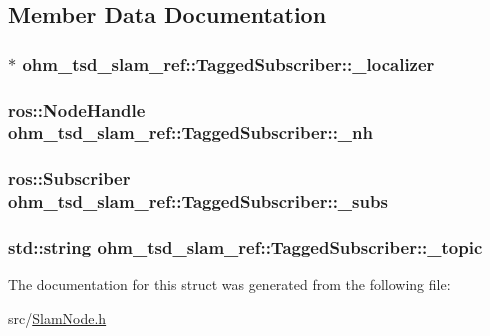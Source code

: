 \subsection{Member Data Documentation}
\hypertarget{structohm__tsd__slam__ref_1_1TaggedSubscriber_afe33f4a8274392173ea2a4ff05f49bc4}{
\subsubsection[{\-\_\-localizer}]{$\ast$ ohm\-\_\-tsd\-\_\-slam\-\_\-ref\-::\-Tagged\-Subscriber\-::\-\_\-localizer}}\label{structohm__tsd__slam__ref_1_1TaggedSubscriber_afe33f4a8274392173ea2a4ff05f49bc4}
\hypertarget{structohm__tsd__slam__ref_1_1TaggedSubscriber_a0ff0c67d13bf2c9c606c25ffa24db8df}{
\subsubsection[{\-\_\-nh}]{\setlength{\rightskip}{0pt plus 5cm}ros\-::\-Node\-Handle ohm\-\_\-tsd\-\_\-slam\-\_\-ref\-::\-Tagged\-Subscriber\-::\-\_\-nh}}\label{structohm__tsd__slam__ref_1_1TaggedSubscriber_a0ff0c67d13bf2c9c606c25ffa24db8df}
\hypertarget{structohm__tsd__slam__ref_1_1TaggedSubscriber_a61345fb4c4b4e617dfffe70b5b1bd60c}{
\subsubsection[{\-\_\-subs}]{\setlength{\rightskip}{0pt plus 5cm}ros\-::\-Subscriber ohm\-\_\-tsd\-\_\-slam\-\_\-ref\-::\-Tagged\-Subscriber\-::\-\_\-subs}}\label{structohm__tsd__slam__ref_1_1TaggedSubscriber_a61345fb4c4b4e617dfffe70b5b1bd60c}
\hypertarget{structohm__tsd__slam__ref_1_1TaggedSubscriber_a768a784062a20f2e9a11a1b528c11605}{
\subsubsection[{\-\_\-topic}]{\setlength{\rightskip}{0pt plus 5cm}std\-::string ohm\-\_\-tsd\-\_\-slam\-\_\-ref\-::\-Tagged\-Subscriber\-::\-\_\-topic}}\label{structohm__tsd__slam__ref_1_1TaggedSubscriber_a768a784062a20f2e9a11a1b528c11605}


The documentation for this struct was generated from the following file\-:\begin{DoxyCompactItemize}
\item 
src/\hyperlink{SlamNode_8h}{Slam\-Node.\-h}\end{DoxyCompactItemize}
